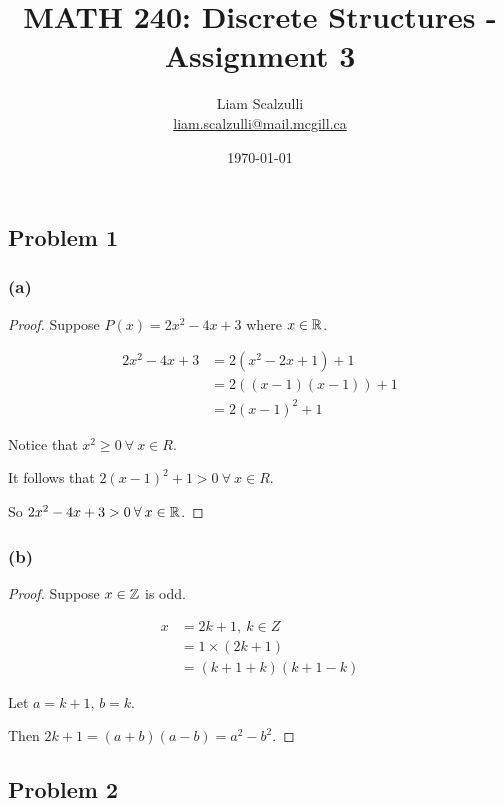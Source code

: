 \documentclass[10pt]{article}
\title{MATH 240: Discrete Structures - Assignment 3}
\author{Liam Scalzulli\\
\href{mailto:liam.scalzulli@mail.mcgill.ca}{liam.scalzulli@mail.mcgill.ca}}
\date{\today}
\begin{document}
\maketitle

\subsection*{Problem 1}

\subsubsection*{(a)}

\begin{proof}
  Suppose $P(x) = 2x^2 - 4x + 3$ where $x \in \mathbb{R}$.

  \begin{align*}
    2x^2 - 4x + 3 &= 2(x^2 - 2x + 1) + 1 \\
      &= 2((x - 1)(x - 1)) + 1 \\
      &= 2(x - 1)^2 + 1
  \end{align*}

  \noindent
  Notice that $x^2 \ge 0 \: \forall \: x \in R$. \spacing

  \noindent
  It follows that $2(x - 1)^2 + 1 > 0 \: \forall \: x \in R$. \spacing

  \noindent
  So $2x^2 - 4x + 3 > 0 \: \forall \: x \in \mathbb{R}$.
\end{proof}

\subsubsection*{(b)}

\begin{proof}
  Suppose $x \in \mathbb{Z}$ is odd.

  \begin{align*}
    x &= 2k + 1, \: k \in Z \\
      &= 1 \times (2k + 1) \\
      &= (k + 1 + k)(k + 1 - k)
  \end{align*}

  \noindent
  Let $a = k + 1$, $b = k$. \spacing

  \noindent
  Then $2k + 1 = (a + b)(a - b) = a^2 - b^2.$
\end{proof}

\subsection*{Problem 2}
\end{document}
